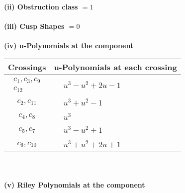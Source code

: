 \documentclass[1p]{elsarticle_modified}
\theoremstyle{definition}
\begin{document}
\flushleft \textbf{(ii) Obstruction class $= 1$}\\~\\
\flushleft \textbf{(iii) Cusp Shapes $= 0$}\\~\\
\newpage\renewcommand{\arraystretch}{1}
\flushleft \textbf{(iv) u-Polynomials at the component}\newline \\
\begin{tabular}{m{50pt}|m{274pt}}
Crossings & \hspace{64pt}u-Polynomials at each crossing \\
\hline $$\begin{aligned}c_{1},c_{3},c_{9}\\c_{12}\end{aligned}$$&$\begin{aligned}
&u^3- u^2+2 u-1
\end{aligned}$\\
\hline $$\begin{aligned}c_{2},c_{11}\end{aligned}$$&$\begin{aligned}
&u^3+u^2-1
\end{aligned}$\\
\hline $$\begin{aligned}c_{4},c_{8}\end{aligned}$$&$\begin{aligned}
&u^3
\end{aligned}$\\
\hline $$\begin{aligned}c_{5},c_{7}\end{aligned}$$&$\begin{aligned}
&u^3- u^2+1
\end{aligned}$\\
\hline $$\begin{aligned}c_{6},c_{10}\end{aligned}$$&$\begin{aligned}
&u^3+u^2+2 u+1
\end{aligned}$\\
\hline
\end{tabular}\\~\\
\newpage\renewcommand{\arraystretch}{1}
\flushleft \textbf{(v) Riley Polynomials at the component}\newline \\
\end{document}
